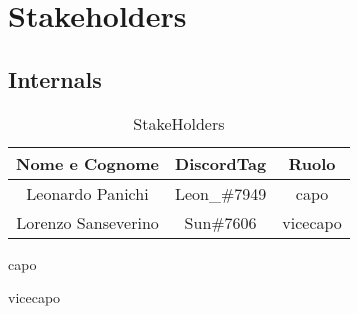\newpage
\section{Stakeholders\label{section:Stakeholders}}
\subsection{Internals}

\begin{table}[!h]
    \centering
    \begin{tabular}{|c|c|c|}
    \hline
    \textbf{Nome e Cognome} & \textbf{DiscordTag} & \textbf{Ruolo}\\
    \hline\hline
    Leonardo Panichi & Leon\_\#7949 & capo\\
    \hline
    Lorenzo Sanseverino & Sun\#7606 & vicecapo\\
    \hline
    \end{tabular}
    \caption{StakeHolders}
    \label{tab:my_label}
\end{table}


\signature{Panichi Leonardo}{capo}
\signature{Sanseverino Lorenzo}{vicecapo}
